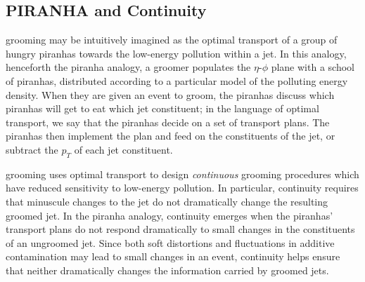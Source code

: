\documentclass[letterpaper,11pt]{article}
\begin{document}
\subsection{PIRANHA{} and Continuity}
\label{sec:pira_intro}

\PIRANHA{} grooming may be intuitively imagined as the optimal transport of a group of hungry piranhas towards the low-energy pollution within a jet.
%
In this analogy, henceforth the piranha analogy, a \PIRANHA{} groomer populates the \(\eta\)-\(\phi\) plane with a school of piranhas, distributed according to a particular model of the polluting energy density.
%
When they are given an event to groom, the piranhas discuss which piranhas will get to eat which jet constituent;
%
in the language of optimal transport, we say that the piranhas decide on a set of transport plans.
%
The piranhas then implement the plan and feed on the constituents of the jet, or subtract the \(p_T\) of each jet constituent.

\PIRANHA{} grooming uses optimal transport to design \textit{continuous} grooming procedures which have reduced sensitivity to low-energy pollution.
%
In particular, continuity requires that minuscule changes to the jet do not dramatically change the resulting groomed jet.
%
In the piranha analogy, continuity emerges when the piranhas' transport plans do not respond dramatically to small changes in the constituents of an ungroomed jet.
%
Since both soft distortions and fluctuations in additive contamination may lead to small changes in an event, continuity helps ensure that neither dramatically changes the information carried by groomed jets.
\end{document}
